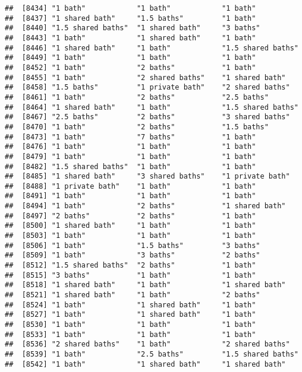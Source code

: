 \documentclass[
]{article}
\begin{document}
\begin{verbatim}
##  [8434] "1 bath"            "1 bath"            "1 bath"           
##  [8437] "1 shared bath"     "1.5 baths"         "1 bath"           
##  [8440] "1.5 shared baths"  "1 shared bath"     "3 baths"          
##  [8443] "1 bath"            "1 shared bath"     "1 bath"           
##  [8446] "1 shared bath"     "1 bath"            "1.5 shared baths" 
##  [8449] "1 bath"            "1 bath"            "1 bath"           
##  [8452] "1 bath"            "2 baths"           "1 bath"           
##  [8455] "1 bath"            "2 shared baths"    "1 shared bath"    
##  [8458] "1.5 baths"         "1 private bath"    "2 shared baths"   
##  [8461] "1 bath"            "2 baths"           "2.5 baths"        
##  [8464] "1 shared bath"     "1 bath"            "1.5 shared baths" 
##  [8467] "2.5 baths"         "2 baths"           "3 shared baths"   
##  [8470] "1 bath"            "2 baths"           "1.5 baths"        
##  [8473] "1 bath"            "7 baths"           "1 bath"           
##  [8476] "1 bath"            "1 bath"            "1 bath"           
##  [8479] "1 bath"            "1 bath"            "1 bath"           
##  [8482] "1.5 shared baths"  "1 bath"            "1 bath"           
##  [8485] "1 shared bath"     "3 shared baths"    "1 private bath"   
##  [8488] "1 private bath"    "1 bath"            "1 bath"           
##  [8491] "1 bath"            "1 bath"            "1 bath"           
##  [8494] "1 bath"            "2 baths"           "1 shared bath"    
##  [8497] "2 baths"           "2 baths"           "1 bath"           
##  [8500] "1 shared bath"     "1 bath"            "1 bath"           
##  [8503] "1 bath"            "1 bath"            "1 bath"           
##  [8506] "1 bath"            "1.5 baths"         "3 baths"          
##  [8509] "1 bath"            "3 baths"           "2 baths"          
##  [8512] "1.5 shared baths"  "2 baths"           "1 bath"           
##  [8515] "3 baths"           "1 bath"            "1 bath"           
##  [8518] "1 shared bath"     "1 bath"            "1 shared bath"    
##  [8521] "1 shared bath"     "1 bath"            "2 baths"          
##  [8524] "1 bath"            "1 shared bath"     "1 bath"           
##  [8527] "1 bath"            "1 shared bath"     "1 bath"           
##  [8530] "1 bath"            "1 bath"            "1 bath"           
##  [8533] "1 bath"            "1 bath"            "1 bath"           
##  [8536] "2 shared baths"    "1 bath"            "2 shared baths"   
##  [8539] "1 bath"            "2.5 baths"         "1.5 shared baths" 
##  [8542] "1 bath"            "1 shared bath"     "1 shared bath"    

\end{verbatim}
\end{document}
